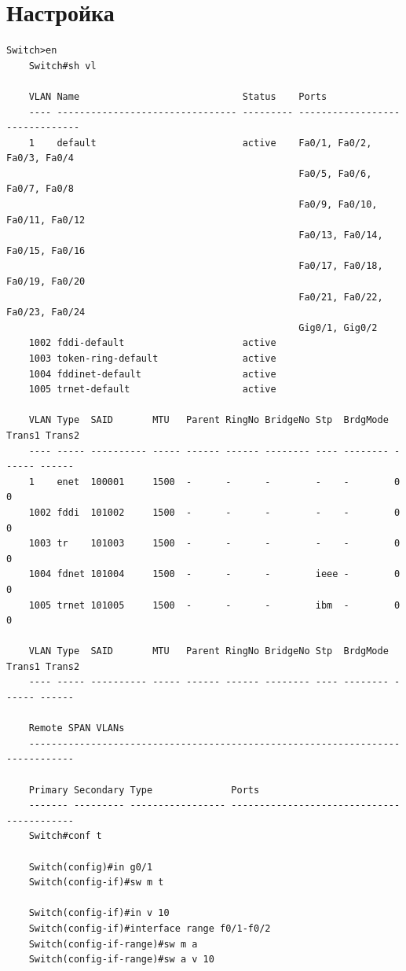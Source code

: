 \documentclass[a4paper,oneside,12pt]{extreport}
\begin{document}
\section{Настройка}

\begin{lstlisting}[gobble=8, caption=Настройка коммутатора Switch0]
	Switch>en
	Switch#sh vl

	VLAN Name                             Status    Ports
	---- -------------------------------- --------- -------------------------------
	1    default                          active    Fa0/1, Fa0/2, Fa0/3, Fa0/4
	                                                Fa0/5, Fa0/6, Fa0/7, Fa0/8
	                                                Fa0/9, Fa0/10, Fa0/11, Fa0/12
	                                                Fa0/13, Fa0/14, Fa0/15, Fa0/16
	                                                Fa0/17, Fa0/18, Fa0/19, Fa0/20
	                                                Fa0/21, Fa0/22, Fa0/23, Fa0/24
	                                                Gig0/1, Gig0/2
	1002 fddi-default                     active
	1003 token-ring-default               active
	1004 fddinet-default                  active
	1005 trnet-default                    active

	VLAN Type  SAID       MTU   Parent RingNo BridgeNo Stp  BrdgMode Trans1 Trans2
	---- ----- ---------- ----- ------ ------ -------- ---- -------- ------ ------
	1    enet  100001     1500  -      -      -        -    -        0      0
	1002 fddi  101002     1500  -      -      -        -    -        0      0
	1003 tr    101003     1500  -      -      -        -    -        0      0
	1004 fdnet 101004     1500  -      -      -        ieee -        0      0
	1005 trnet 101005     1500  -      -      -        ibm  -        0      0

	VLAN Type  SAID       MTU   Parent RingNo BridgeNo Stp  BrdgMode Trans1 Trans2
	---- ----- ---------- ----- ------ ------ -------- ---- -------- ------ ------

	Remote SPAN VLANs
	------------------------------------------------------------------------------

	Primary Secondary Type              Ports
	------- --------- ----------------- ------------------------------------------
	Switch#conf t

	Switch(config)#in g0/1
	Switch(config-if)#sw m t

	Switch(config-if)#in v 10
	Switch(config-if)#interface range f0/1-f0/2
	Switch(config-if-range)#sw m a
	Switch(config-if-range)#sw a v 10


\end{lstlisting}
\end{document}
